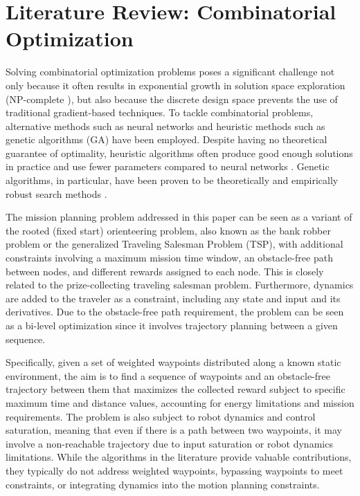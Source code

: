 \section{Literature Review: Combinatorial Optimization}
Solving combinatorial optimization problems poses a significant challenge not only because it often results in exponential growth in solution space exploration (NP-complete \cite{gerkey2004formal}), but also because the discrete design space prevents the use of traditional gradient-based techniques. To tackle combinatorial problems, alternative methods such as neural networks \cite{Peng2021GraphLF} and heuristic methods such as genetic algorithms (GA) \cite{7130169} have been employed.
Despite having no theoretical guarantee of optimality, heuristic algorithms often produce good enough solutions in practice \cite{Peng2021GraphLF} and use fewer parameters compared to neural networks \cite{9626724}. Genetic algorithms, in particular, have been proven to be theoretically and empirically robust search methods \cite{10.5555/534133}.



The mission planning problem addressed in this paper can be seen as a variant of the rooted (fixed start) orienteering problem, also known as the bank robber problem or the generalized Traveling Salesman Problem (TSP), with additional constraints involving a maximum mission time window, an obstacle-free path between nodes, and different rewards assigned to each node. This is closely related to the prize-collecting traveling salesman problem. Furthermore, dynamics are added to the traveler as a constraint, including any state and input and its derivatives. Due to the obstacle-free path requirement, the problem can be seen as a bi-level optimization since it involves trajectory planning between a given sequence.

Specifically, given a set of weighted waypoints distributed along a known static environment, the aim is to find a sequence of waypoints and an obstacle-free trajectory between them that maximizes the collected reward subject to specific maximum time and distance values, accounting for energy limitations and mission requirements. The problem is also subject to robot dynamics and control saturation, meaning that even if there is a path between two waypoints, it may involve a non-reachable trajectory due to input saturation or robot dynamics limitations. While the algorithms in the literature \cite{7185453,8613017,9196516} provide valuable contributions, they typically do not address weighted waypoints, bypassing waypoints to meet constraints, or integrating dynamics into the motion planning constraints.

